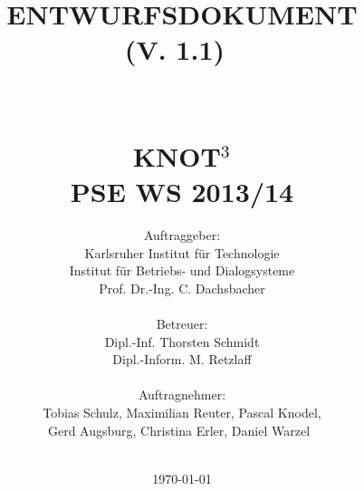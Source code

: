 \documentclass{scrreprt}
\begin{document}
\title{\textbf{\Huge{ENTWURFSDOKUMENT}}\\\Large{(V. 1.1)}~\\~\\~\\
		\textbf{\Large{KNOT$^3$}}\\
		PSE WS 2013/14}
\author{\Large{Auftraggeber:}\\
        \Large{Karlsruher Institut für Technologie}\\
        \Large{Institut für Betriebs- und Dialogsysteme}\\
        \Large{Prof. Dr.-Ing. C. Dachsbacher}\\~\\
        \Large{Betreuer:}\\
        \Large{Dipl.-Inf. Thorsten Schmidt}\\
        \Large{Dipl.-Inform. M. Retzlaff}\\~\\
        \Large{Auftragnehmer:}\\
        \Large{Tobias Schulz, Maximilian Reuter, Pascal                    Knodel,}\\
	 	\Large{Gerd Augsburg, Christina Erler, Daniel Warzel}~\\~\\}
\date{\today}

\maketitle

\tableofcontents






\appendix



\end{document}
